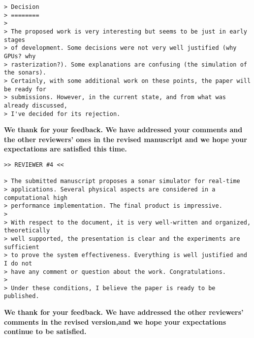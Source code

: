 \documentclass{article}
\begin{document}
\begin{verbatim}
> Decision
> ========
>
> The proposed work is very interesting but seems to be just in early stages
> of development. Some decisions were not very well justified (why GPUs? why
> rasterization?). Some explanations are confusing (the simulation of the sonars).
> Certainly, with some additional work on these points, the paper will be ready for
> submissions. However, in the current state, and from what was already discussed,
> I've decided for its rejection.
\end{verbatim}

\textbf{We thank for your feedback. We have addressed your comments and the other
reviewers' ones in the revised manuscript and we hope your expectations are
satisfied this time.}

\begin{verbatim}
>> REVIEWER #4 <<

> The submitted manuscript proposes a sonar simulator for real-time
> applications. Several physical aspects are considered in a computational high
> performance implementation. The final product is impressive.
>
> With respect to the document, it is very well-written and organized, theoretically
> well supported, the presentation is clear and the experiments are sufficient
> to prove the system effectiveness. Everything is well justified and I do not
> have any comment or question about the work. Congratulations.
>
> Under these conditions, I believe the paper is ready to be published.
\end{verbatim}

\textbf{We thank for your feedback. We have addressed the other reviewers' comments in the revised
version,and we hope your expectations continue to be satisfied.}
\end{document}
